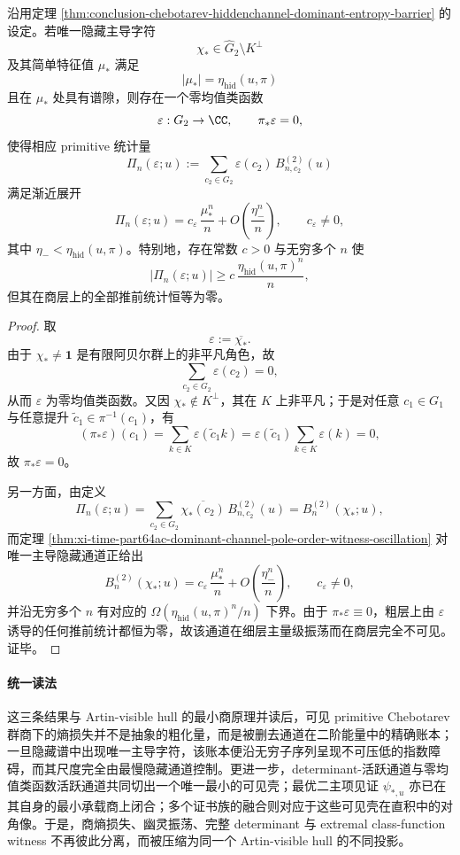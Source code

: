 \begin{theorem}\label{thm:conclusion-hidden-artin-ghost-oscillation}
沿用定理 \ref{thm:conclusion-chebotarev-hiddenchannel-dominant-entropy-barrier} 的设定。若唯一隐藏主导字符
\[
\chi_\ast\in \widehat G_2\setminus K^\perp
\]
及其简单特征值 \(\mu_\ast\) 满足
\[
|\mu_\ast|=\eta_{\mathrm{hid}}(u,\pi)
\]
且在 \(\mu_\ast\) 处具有谱隙，则存在一个零均值类函数
\[
\varepsilon:G_2\to \CC,
\qquad
\pi_\ast\varepsilon=0,
\]
使得相应 primitive 统计量
\[
\Pi_n(\varepsilon;u)
:=
\sum_{c_2\in G_2}\varepsilon(c_2)\,B_{n,c_2}^{(2)}(u)
\]
满足渐近展开
\[
\Pi_n(\varepsilon;u)
=
c_\varepsilon\,\frac{\mu_\ast^n}{n}
+
O\!\left(\frac{\eta_-^n}{n}\right),
\qquad
c_\varepsilon\neq 0,
\]
其中 \(\eta_-<\eta_{\mathrm{hid}}(u,\pi)\)。特别地，存在常数 \(c>0\) 与无穷多个 \(n\) 使
\[
|\Pi_n(\varepsilon;u)|
\ge
c\,\frac{\eta_{\mathrm{hid}}(u,\pi)^n}{n},
\]
但其在商层上的全部推前统计恒等为零。
\end{theorem}
\begin{proof}
取
\[
\varepsilon:=\overline{\chi_\ast}.
\]
由于 \(\chi_\ast\neq \mathbf 1\) 是有限阿贝尔群上的非平凡角色，故
\[
\sum_{c_2\in G_2}\varepsilon(c_2)=0,
\]
从而 \(\varepsilon\) 为零均值类函数。又因 \(\chi_\ast\notin K^\perp\)，其在 \(K\) 上非平凡；于是对任意 \(c_1\in G_1\) 与任意提升 \(\widetilde c_1\in \pi^{-1}(c_1)\)，有
\[
(\pi_\ast\varepsilon)(c_1)
=
\sum_{k\in K}\varepsilon(\widetilde c_1k)
=
\varepsilon(\widetilde c_1)\sum_{k\in K}\varepsilon(k)
=
0,
\]
故 \(\pi_\ast\varepsilon=0\)。

另一方面，由定义
\[
\Pi_n(\varepsilon;u)
=
\sum_{c_2\in G_2}\overline{\chi_\ast(c_2)}\,B_{n,c_2}^{(2)}(u)
=
B_n^{(2)}(\chi_\ast;u),
\]
而定理 \ref{thm:xi-time-part64ac-dominant-channel-pole-order-witness-oscillation} 对唯一主导隐藏通道正给出
\[
B_n^{(2)}(\chi_\ast;u)
=
c_\varepsilon\,\frac{\mu_\ast^n}{n}
+
O\!\left(\frac{\eta_-^n}{n}\right),
\qquad
c_\varepsilon\neq 0,
\]
并沿无穷多个 \(n\) 有对应的 \(\Omega(\eta_{\mathrm{hid}}(u,\pi)^n/n)\) 下界。由于 \(\pi_\ast\varepsilon\equiv 0\)，粗层上由 \(\varepsilon\) 诱导的任何推前统计都恒为零，故该通道在细层主量级振荡而在商层完全不可见。证毕。
\end{proof}



\paragraph{统一读法}
这三条结果与 Artin-visible hull 的最小商原理并读后，可见 primitive Chebotarev 群商下的熵损失并不是抽象的粗化量，而是被删去通道在二阶能量中的精确账本；一旦隐藏谱中出现唯一主导字符，该账本便沿无穷子序列呈现不可压低的指数障碍，而其尺度完全由最慢隐藏通道控制。更进一步，determinant-活跃通道与零均值类函数活跃通道共同切出一个唯一最小的可见壳；最优二主项见证 \(\psi_{\ast,u}\) 亦已在其自身的最小承载商上闭合；多个证书族的融合则对应于这些可见壳在直积中的对角像。于是，商熵损失、幽灵振荡、完整 determinant 与 extremal class-function witness 不再彼此分离，而被压缩为同一个 Artin-visible hull 的不同投影。

\endinput
